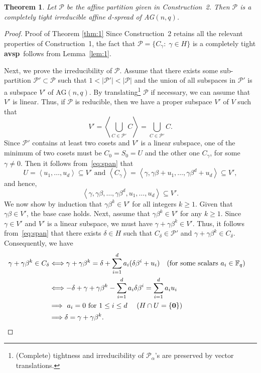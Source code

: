 \documentclass[10pt,a4paper]{amsart}
\newtheorem{theorem}{Theorem}
\def \F{{\mathbb F}}
\def \P{{\mathcal P}}
\def \al{\alpha}
\def \avsp{\mbox{\bf avsp}}
\def \be{\beta}
\def \de{\delta}
\def \ga{\gamma}
\def \la{\left\langle}
\def \o{\mbox{\bf 0} }
\def \ra{\right\rangle}
\begin{document}
\begin{theorem}\label{thm:2}
Let $\P$ be the affine partition given in Construction~2. Then $\P$ is a completely tight irreducible affine $d$-spread of AG$(n,q)$.
\end{theorem}

\begin{proof}{Proof of Theorem \ref{thm:1}}
Since Construction~2 retains all the relevant properties of Construction~1, the fact that $\P=\{C_{\ga}:\; \ga\in H\}$ is a completely tight \avsp~follows from Lemma~\ref{lem:1}.

Next, we prove the irreducibility of $\P$. Assume that there exists some sub-partition $\P'\subset \P$ such that $1<|\P'|<|\P|$ and the union of all subspaces in $\P'$ is a subspace $V'$ of AG$(n,q)$. 
By translating\footnote{(Complete) tightness and irreducibility of $\P_\al$'s are preserved by vector translations.} $\P$ if necessary, we can assume that $V'$ is linear. Thus, if $\P$ is reducible, then we have a proper subspace $V'$ of $V$ such that
%
\begin{equation}\label{eq:span}
V'=\la \bigcup_{C\in \P'} C\ra=\bigcup_{C\in \P'} C.
\end{equation}
%
Since $\P'$ contains at least two cosets and $V'$ is a linear subspace,  one of the minimum of two cosets must be $C_{0}=S_0=U$ and the other one $C_{\ga}$, for some $\ga\not=0$.
Then it follows from~\eqref{eq:span} that
\[U=\la u_1, \ldots, u_d\ra \subseteq V'\mbox{ and } \la C_{\ga}\ra = \la \ga, \ga\be+u_1,\ldots,\ga\be^d+u_d\ra\subseteq V',\]
and hence,
 \[\la \ga,\ga\be,\ldots,\ga\be^d, u_1, \ldots, u_d\ra \subseteq V'.\]
 We now show by induction that $\ga \be^k\in V'$ for all integers $k\geq1$.
Given that $\ga \be\in V'$, the base case holds. Next, assume that $\ga \be^k\in V'$ for any $k\geq1$. Since $\ga\in V'$ and $V'$ is a linear subspace, we must have $\ga+\ga \be^k\in V'$. Thus, 
it follows from~\eqref{eq:span} that there exists $\de\in H$ such that  $C_\de\in\P'$ and $\ga+\ga \be^k \in C_\de$. Consequently, we have
%
\begin{align*}\label{eq:cond1}
\ga+\ga \be^k \in C_\de 
& \Longleftrightarrow 
\ga+\ga \be^k = \de+\sum_{i=1}^d a_i (\de\be^i+u_i) \quad \mbox{(for some scalars $a_i\in \F_q$)}\cr 
& \Longleftrightarrow 
-\de+\ga+\ga \be^k -\sum_{i=1}^d a_i \de\be^i=\sum_{i=1}^d a_i u_i  \cr 
& \Longrightarrow 
 \mbox{ $a_i=0$ for $1\leq i\leq d$ } \quad (H\cap U=\{ \o\}) 
 \cr
 & \Longrightarrow 
\de=\ga+\ga \be^k.
\end{align*}
%


\end{proof}
\end{document}
